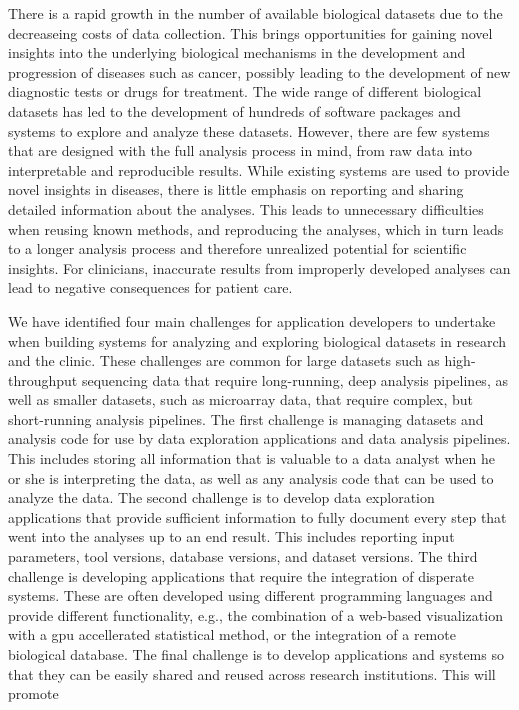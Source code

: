 There is a rapid growth in the number of available biological datasets due to
the decreaseing costs of data collection. This brings opportunities for gaining
novel insights into the underlying biological mechanisms in the development and
progression of diseases such as cancer, possibly leading to the development of
new diagnostic tests or drugs for treatment. The wide range of different
biological datasets has led to the development of hundreds of software packages
and systems to explore and analyze these datasets. However, there are few
systems that are designed with the full analysis process in mind, from raw data
into interpretable and reproducible results.  While existing systems are used to
provide novel insights in diseases, there is little emphasis on reporting and
sharing detailed information about the analyses. This leads to unnecessary
difficulties when reusing known methods, and reproducing the analyses, which in
turn leads to a longer analysis process and therefore unrealized potential for
scientific insights. For clinicians, inaccurate results from improperly
developed analyses can lead to negative consequences for patient
care.\cite{roy2017standards}

We have identified four main challenges for application developers to undertake
when building systems for analyzing and exploring biological datasets in
research and the clinic. These challenges are common for large datasets such as
high-throughput sequencing data that require long-running, deep analysis
pipelines, as well as smaller datasets, such as microarray data, that require
complex, but short-running analysis pipelines. The first challenge is managing
datasets and analysis code for use by data exploration applications and data
analysis pipelines. This includes storing all information that is valuable to a
data analyst when he or she is interpreting the data, as well as any analysis
code that can be used to analyze the data. The second challenge is to develop
data exploration applications that provide sufficient information to fully
document every step that went into the analyses up to an end result. This
includes reporting input parameters, tool versions, database versions, and
dataset versions. The third challenge is developing applications that require
the integration of disperate systems. These are often developed using different
programming languages and provide different functionality, e.g., the combination
of a web-based visualization with a \gls{gpu} accellerated statistical method,
or the integration of a remote biological database.
The final challenge is to develop applications and systems so that they can be
easily shared and reused across research institutions. This will promote 

